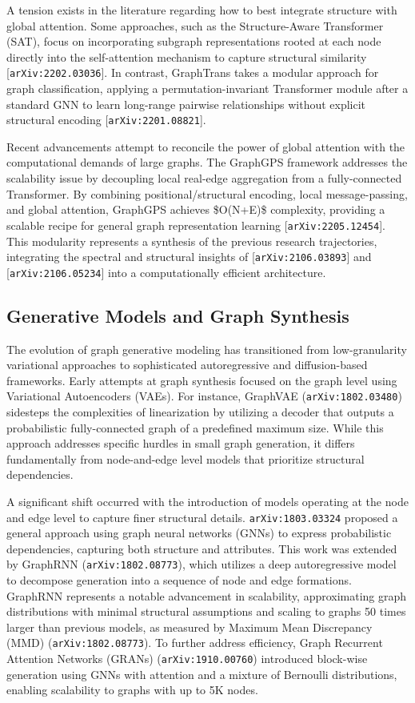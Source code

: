\documentclass[11pt]{article}
\begin{document}
A tension exists in the literature regarding how to best integrate structure with global attention. Some approaches, such as the Structure-Aware Transformer (SAT), focus on incorporating subgraph representations rooted at each node directly into the self-attention mechanism to capture structural similarity [\texttt{arXiv:2202.03036}]. In contrast, GraphTrans takes a modular approach for graph classification, applying a permutation-invariant Transformer module after a standard GNN to learn long-range pairwise relationships without explicit structural encoding [\texttt{arXiv:2201.08821}].

Recent advancements attempt to reconcile the power of global attention with the computational demands of large graphs. The GraphGPS framework addresses the scalability issue by decoupling local real-edge aggregation from a fully-connected Transformer. By combining positional/structural encoding, local message-passing, and global attention, GraphGPS achieves \$O(N+E)\$ complexity, providing a scalable recipe for general graph representation learning [\texttt{arXiv:2205.12454}]. This modularity represents a synthesis of the previous research trajectories, integrating the spectral and structural insights of [\texttt{arXiv:2106.03893}] and [\texttt{arXiv:2106.05234}] into a computationally efficient architecture.

\subsection{Generative Models and Graph Synthesis}

The evolution of graph generative modeling has transitioned from low-granularity variational approaches to sophisticated autoregressive and diffusion-based frameworks. Early attempts at graph synthesis focused on the graph level using Variational Autoencoders (VAEs). For instance, GraphVAE (\texttt{arXiv:1802.03480}) sidesteps the complexities of linearization by utilizing a decoder that outputs a probabilistic fully-connected graph of a predefined maximum size. While this approach addresses specific hurdles in small graph generation, it differs fundamentally from node-and-edge level models that prioritize structural dependencies.

A significant shift occurred with the introduction of models operating at the node and edge level to capture finer structural details. \texttt{arXiv:1803.03324} proposed a general approach using graph neural networks (GNNs) to express probabilistic dependencies, capturing both structure and attributes. This work was extended by GraphRNN (\texttt{arXiv:1802.08773}), which utilizes a deep autoregressive model to decompose generation into a sequence of node and edge formations. GraphRNN represents a notable advancement in scalability, approximating graph distributions with minimal structural assumptions and scaling to graphs 50 times larger than previous models, as measured by Maximum Mean Discrepancy (MMD) (\texttt{arXiv:1802.08773}). To further address efficiency, Graph Recurrent Attention Networks (GRANs) (\texttt{arXiv:1910.00760}) introduced block-wise generation using GNNs with attention and a mixture of Bernoulli distributions, enabling scalability to graphs with up to 5K nodes.
\end{document}
